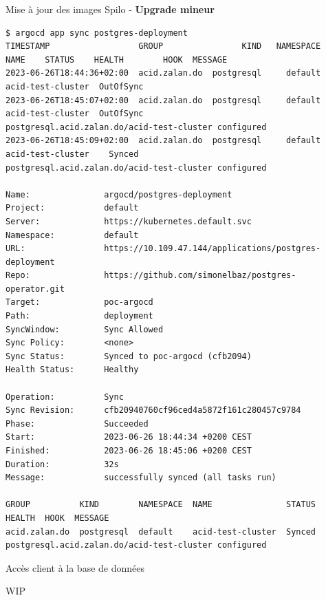 \begin{frame}[fragile,shrink=4]{Mise à jour des images Spilo - \textbf{Upgrade mineur}}

   \begin{itemize}
\begin{tiny}
\begin{Verbatim}[commandchars=\\\{\}]
$ argocd app sync postgres-deployment
TIMESTAMP                  GROUP                KIND   NAMESPACE                  NAME    STATUS    HEALTH        HOOK  MESSAGE
2023-06-26T18:44:36+02:00  acid.zalan.do  postgresql     default     acid-test-cluster  OutOfSync                       
2023-06-26T18:45:07+02:00  acid.zalan.do  postgresql     default     acid-test-cluster  OutOfSync                       postgresql.acid.zalan.do/acid-test-cluster configured
2023-06-26T18:45:09+02:00  acid.zalan.do  postgresql     default     acid-test-cluster    Synced                       postgresql.acid.zalan.do/acid-test-cluster configured

Name:               argocd/postgres-deployment
Project:            default
Server:             https://kubernetes.default.svc
Namespace:          default
URL:                https://10.109.47.144/applications/postgres-deployment
Repo:               https://github.com/simonelbaz/postgres-operator.git
Target:             poc-argocd
Path:               deployment
SyncWindow:         Sync Allowed
Sync Policy:        <none>
Sync Status:        Synced to poc-argocd (cfb2094)
Health Status:      Healthy

Operation:          Sync
Sync Revision:      cfb20940760cf96ced4a5872f161c280457c9784
Phase:              Succeeded
Start:              2023-06-26 18:44:34 +0200 CEST
Finished:           2023-06-26 18:45:06 +0200 CEST
Duration:           32s
Message:            successfully synced (all tasks run)

GROUP          KIND        NAMESPACE  NAME               STATUS  HEALTH  HOOK  MESSAGE
acid.zalan.do  postgresql  default    acid-test-cluster  Synced                postgresql.acid.zalan.do/acid-test-cluster configured
\end{Verbatim}
\end{tiny}
   \end{itemize}

\end{frame}


\begin{frame}[fragile]{Accès client à la base de données}

   WIP

\end{frame}


